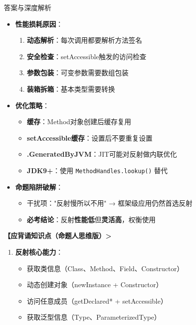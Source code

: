 \documentclass[12pt, a4paper]{ctexart}
\begin{document}
\begin{bluebox}{答案与深度解析}
\begin{itemize}[label={}, leftmargin=*, nosep]
\begin{itemize}[label={}, leftmargin=*, nosep]
\begin{lstlisting}[language=Java]
        // 反射调用：约 50-100ns（首次更慢）
        Method m = Person.class.getMethod("sayHello");
        m.invoke(p);
    }
}
      \end{lstlisting}

			      \item \textbf{性能损耗原因}：
			            \begin{enumerate}
				            \item \textbf{动态解析}：每次调用都要解析方法签名
				            \item \textbf{安全检查}：setAccessible触发的访问检查
				            \item \textbf{参数包装}：可变参数需要数组包装
				            \item \textbf{装箱拆箱}：基本类型需要转换
			            \end{enumerate}

			      \item \textbf{优化策略}：
			            \begin{itemize}[label={}, nosep]
				            \item \textbf{缓存}：Method对象创建后缓存复用
				            \item \textbf{setAccessible缓存}：设置后不要重复设置
				            \item \textbf{.GeneratedByJVM}：JIT可能对反射做内联优化
				            \item \textbf{JDK9+}：使用 \texttt{MethodHandles.lookup()} 替代
			            \end{itemize}

			      \item \textbf{命题陷阱破解}：
			            \begin{itemize}[label={}, nosep]
				            \item 干扰项："反射慢所以不用" → 框架级应用仍然首选反射
				            \item \textbf{必考结论}：反射\textbf{性能低}但\textbf{灵活高}，权衡使用
			            \end{itemize}
		      \end{itemize}

		      \textbf{【应背诵知识点（命题人思维版）>}
		      \begin{enumerate}[leftmargin=*, nosep]
			      \item \textbf{反射核心能力}：
			            \begin{itemize}[label={}, nosep]
				            \item \checkmark 获取类信息（Class、Method、Field、Constructor）
				            \item \checkmark 动态创建对象（newInstance + Constructor）
				            \item \checkmark 访问任意成员（getDeclared* + setAccessible）
				            \item \checkmark 获取泛型信息（Type、ParameterizedType）
			            \end{itemize}


\end{enumerate}
\end{itemize}
\end{bluebox}
\end{document}
